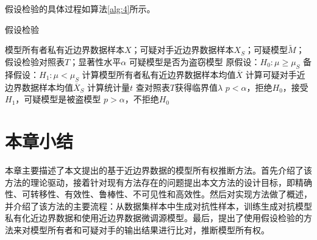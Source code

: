假设检验的具体过程如算法\ref{alg:4}所示。

\begin{algorithm}[h] 
	\caption{假设检验}
	\label{alg:4}
	\begin{algorithmic}[1]
		
		\Require 模型所有者私有近边界数据样本$X$；可疑对手近边界数据样本$X_S$；可疑模型$\tilde{M}$；假设检验对照表$T$；显著性水平$\alpha$
		\Ensure 可疑模型是否为盗窃模型
		\State 原假设：$H_0:\mu \geq \mu_S$
		\State 备择假设：$H_1:\mu < \mu_S$
		\State 计算模型所有者私有近边界数据样本均值$\overline{X}$                     
		\State 计算可疑对手近边界数据样本均值$\overline{X}_S$ 
		\State 计算统计量$t$
		\State 查对照表$T$获得临界值$\lambda$
		\State $p < \alpha$，拒绝$H_0$，接受$H_1$，可疑模型是被盗模型
		\Else \State $p > \alpha$，不拒绝$H_0$
		\EndIf
	\end{algorithmic}
\end{algorithm}

\section{本章小结}

本章主要描述了本文提出的基于近边界数据的模型所有权推断方法。首先介绍了该方法的理论驱动，接着针对现有方法存在的问题提出本文方法的设计目标，即精确性、可转移性、有效性、鲁棒性、不可见性和高效性。然后对实现方法做了概述，并介绍了该方法的主要流程：从数据集样本中生成对抗性样本，训练生成对抗模型私有化近边界数据和使用近边界数据微调源模型。最后，提出了使用假设检验的方法来对模型所有者和可疑对手的输出结果进行比对，推断模型所有权。
